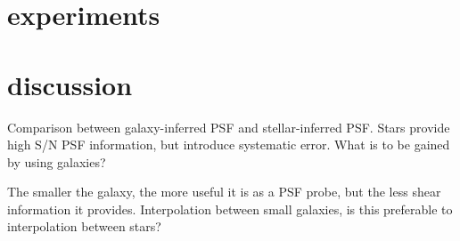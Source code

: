 \documentclass[12pt,letterpaper]{article}
\begin{document}
\section{experiments}

\section{discussion}

Comparison between galaxy-inferred PSF and stellar-inferred PSF. Stars provide high S/N PSF information, but introduce systematic error. What is to be gained by using galaxies?

The smaller the galaxy, the more useful it is as a PSF probe, but the less shear information it provides. Interpolation between small galaxies, is this preferable to interpolation between stars?
\end{document}
